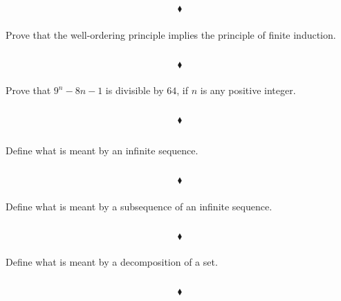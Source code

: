 $$\blacklozenge$$

\subsubsection{}
\begin{tcolorbox}
Prove that the well-ordering principle implies the principle of finite induction. 
\end{tcolorbox}
$$ $$

$$\blacklozenge$$

\subsubsection{}
\begin{tcolorbox}
 Prove that $9^n-8n-1$ is divisible by $64$, if $n$ is any positive integer. 
\end{tcolorbox}
$$ $$

$$\blacklozenge$$


\renewcommand{\thesubsection}{\thesection.\RomanNumeralCaps{8}}
\subsection{}
\subsubsection{}
\begin{tcolorbox}
Define what is meant by an infinite sequence.
\end{tcolorbox}
$$ $$

$$\blacklozenge$$

\subsubsection{}
\begin{tcolorbox}
Define what is meant by a subsequence of an infinite sequence.
\end{tcolorbox}
$$ $$

$$\blacklozenge$$

\subsubsection{}
\begin{tcolorbox}
Define what is meant by a decomposition of a set.
\end{tcolorbox}
$$ $$

$$\blacklozenge$$

